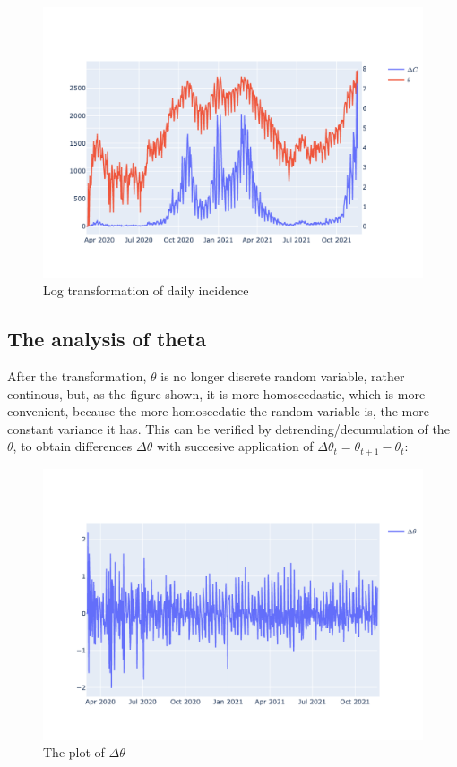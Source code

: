 \documentclass[
  digital, %
  table,   %
  twoside, %
  12pt,
  lof,     %
  lot,     %
]{fithesis3}
\begin{document}
\begin{figure}[h]
  \begin{center}
    \includegraphics[width=\textwidth]{images/incidence-log-transform.png}
  \end{center}
  \caption{Log transformation of daily incidence}
  \label{fig:incidence-log-transform}
\end{figure}


\subsection{The analysis of theta}

After the transformation, $\theta$ is no 
longer discrete random variable, rather 
continous, but, as the figure shown, it 
is more homoscedastic, which is more 
convenient, because the more homoscedatic 
the random variable is, the more constant variance 
it has. 
This can be verified by detrending/decumulation 
of the $\theta$, to obtain differences 
$\Delta \theta$ with succesive application of 
$\Delta \theta_t = \theta_{t+1} - \theta_{t}$:

\begin{figure}[h]
  \begin{center}
    \includegraphics[width=\textwidth]{images/theta-diff-figure.png}
  \end{center}
  \caption{The plot of $\Delta \theta$}
  \label{fig:theta-diff}
\end{figure}
\end{document}
